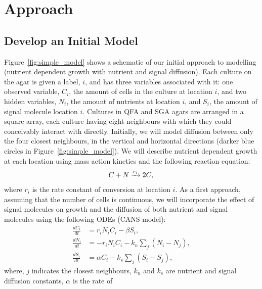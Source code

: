\graphicspath{{images_low_res/}}
\section{Approach}
\label{sec:approach}

\subsection{Develop an Initial Model}
\label{sec:initial_model}

Figure~\ref{fig:simple_model} shows a schematic of our initial
approach to modelling (nutrient dependent growth with nutrient and
signal diffusion).  Each culture on the agar is given a label, \(i\),
and has three variables associated with it: one observed variable,
\(C_{i}\), the amount of cells in the culture at location \(i\), and
two hidden variables, \(N_{i}\), the amount of nutrients at location
\(i\), and \(S_{i}\), the amount of signal molecule location \(i\).
Cultures in QFA and SGA agars are arranged in a square array, each
culture having eight neighbours with which they could conceivably
interact with directly. Initially, we will model diffusion between
only the four closest neighbours, in the vertical and horizontal
directions (darker blue circles in Figure~\ref{fig:simple_model}).  We
will describe nutrient dependent growth at each location using mass
action kinetics and the following reaction equation:
\begin{equation}
  \label{eq:1}
  C + N \xrightarrow[]{r_{i}} 2C,\\
\end{equation}
where \(r_{i}\) is the rate constant of conversion at location \(i\).
As a first approach, assuming that the number of cells is continuous,
we will incorporate the effect of signal molecules on growth and the
diffusion of both nutrient and signal molecules using the following
ODEs (CANS model):
\begin{subequations}
  \label{eq:2}
  \begin{align}
    \frac{dC_{i}}{dt}& = r_{i}N_{i}C_{i} - \beta S_{i},\\
    \frac{dN_{i}}{dt}& = - r_{i}N_{i}C_{i} - k_{n}\sum_{j}(N_{i} - N_{j}),\\
    \frac{dS_{i}}{dt}& = \alpha C_{i} - k_{s}\sum_{j}(S_{i} - S_{j}),
  \end{align}
\end{subequations}
where, \(j\) indicates the closest neighbours, \(k_{n}\) and \(k_{s}\)
are nutrient and signal diffusion constants, \(\alpha\) is the rate of
